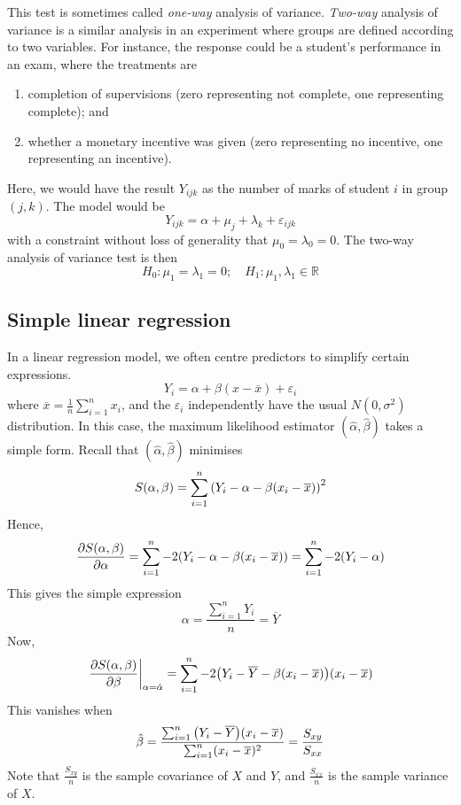 \begin{remark}
	This test is sometimes called \textit{one-way} analysis of variance.
	\textit{Two-way} analysis of variance is a similar analysis in an experiment where groups are defined according to two variables.
	For instance, the response could be a student's performance in an exam, where the treatments are
	\begin{enumerate}
		\item completion of supervisions (zero representing not complete, one representing complete); and
		\item whether a monetary incentive was given (zero representing no incentive, one representing an incentive).
	\end{enumerate}
	Here, we would have the result \( Y_{ijk} \) as the number of marks of student \( i \) in group \( (j,k) \).
	The model would be
	\[
		Y_{ijk} = \alpha + \mu_j + \lambda_k + \varepsilon_{ijk}
	\]
	with a constraint without loss of generality that \( \mu_0 = \lambda_0 = 0 \).
	The two-way analysis of variance test is then
	\[
		H_0 \colon \mu_1 = \lambda_1 = 0;\quad H_1 \colon \mu_1, \lambda_1 \in \mathbb R
	\]
\end{remark}

\subsection{Simple linear regression}
In a linear regression model, we often centre predictors to simplify certain expressions.
\[
	Y_i = \alpha + \beta (x - \overline x) + \varepsilon_i
\]
where \( \overline x = \frac{1}{n} \sum_{i=1}^n x_i \), and the \( \varepsilon_i \) independently have the usual \( N(0, \sigma^2) \) distribution.
In this case, the maximum likelihood estimator \( (\hat \alpha, \hat \beta) \) takes a simple form.
Recall that \( (\hat \alpha, \hat \beta) \) minimises
\[
	S(\alpha, \beta) = \sum_{i=1}^n \qty(Y_i - \alpha - \beta(x_i - \overline x))^2
\]
Hence,
\[
	\pdv{S(\alpha, \beta)}{\alpha} = \sum_{i=1}^n -2\qty(Y_i - \alpha - \beta(x_i - \overline x)) = \sum_{i=1}^n -2\qty(Y_i - \alpha)
\]
This gives the simple expression
\[
	\alpha = \frac{\sum_{i=1}^n Y_i}{n} = \overline Y
\]
Now,
\[
	\eval{\pdv{S(\alpha, \beta)}{\beta}}_{\alpha = \hat \alpha} = \sum_{i=1}^n -2\qty(Y_i - \overline Y - \beta(x_i - \overline x))(x_i - \overline x)
\]
This vanishes when
\[
	\hat \beta = \frac{\sum_{i=1}^n \qty(Y_i - \overline Y)(x_i - \overline x)}{\sum_{i=1}^n (x_i - \overline x)^2} = \frac{S_{xy}}{S_{xx}}
\]
Note that \( \frac{S_{xy}}{n} \) is the sample covariance of \( X \) and \( Y \), and \( \frac{S_{xx}}{n} \) is the sample variance of \( X \).
